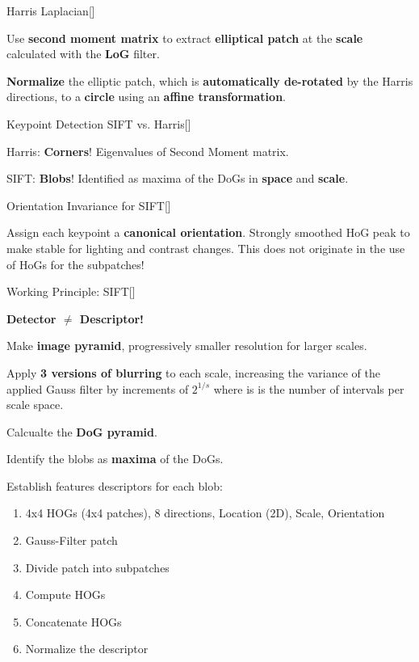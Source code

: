 \documentclass[10pt,a4paper]{scrartcl}
\begin{document}
\begin{multicols*}{2}
\begin{QandA}{Harris Laplacian}[\Definition]
\item Use \textbf{second moment matrix} to extract \textbf{elliptical patch} at the \textbf{scale} calculated with the \textbf{LoG} filter.
\item \textbf{Normalize} the elliptic patch, which is \textbf{automatically de-rotated} by the Harris directions, to a \textbf{circle} using an \textbf{affine transformation}.
\end{QandA} 

\begin{QandA}
{Keypoint Detection SIFT vs. Harris}[\Comparison]
\item Harris: \textbf{Corners}! Eigenvalues of Second Moment matrix.
\item SIFT: \textbf{Blobs}! Identified as maxima of the DoGs in \textbf{space} and \textbf{scale}.
\end{QandA}

\begin{QandA}
{Orientation Invariance for SIFT}[\Application]
\item Assign each keypoint a \textbf{canonical orientation}. Strongly smoothed HoG peak to make stable for lighting and contrast changes. This does not originate in the use of HoGs for the subpatches!
\end{QandA}

\begin{QandA}
{Working Principle: SIFT}[\Derivation]
\item \textbf{Detector $\neq$ Descriptor!}
\item Make \textbf{image pyramid}, progressively smaller resolution for larger scales.
\item Apply \textbf{3 versions of blurring} to each scale, increasing the variance of the applied Gauss filter by increments of $2^{1/s}$ where is is the number of intervals per scale space.
\item Calcualte the \textbf{DoG pyramid}.
\item Identify the blobs as \textbf{maxima} of the DoGs.
\item Establish features descriptors for each blob:
\begin{enumerate}
\item 4x4 HOGs (4x4 patches), 8 directions, Location (2D), Scale, Orientation
\item Gauss-Filter patch
\item Divide patch into subpatches
\item Compute HOGs
\item Concatenate HOGs
\item Normalize the descriptor
\end{enumerate}
\end{QandA}   


\end{multicols*}
\end{document}
